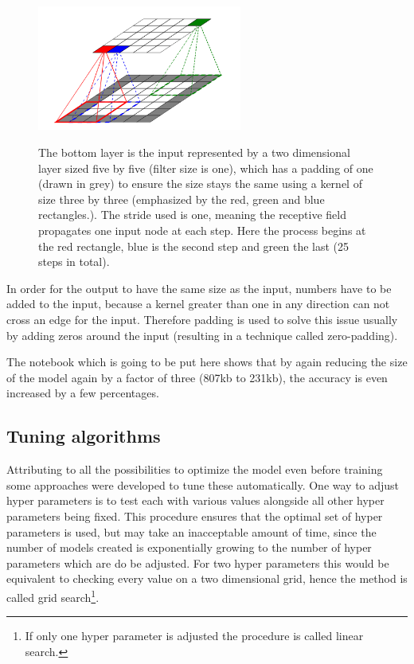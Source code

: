 \begin{figure}
    \centering
    \caption{ The bottom layer is the input represented by a two dimensional layer sized five by five (filter size is one), which has a padding of one (drawn in grey) to ensure the size stays the same using a kernel of size three by three (emphasized by the red, green and blue rectangles.). The stride used is one, meaning the receptive field propagates one input node at each step. Here the process begins at the red rectangle, blue is the second step and green the last (25  steps in total). }
    \includegraphics[width=0.6\textwidth]{images/conv_layer.png}
    \label{fig:conv_layer}
\end{figure}

In order for the output to have the same size as the input, numbers have to be added to the input, because a kernel greater than one in any direction can not cross an edge for the input.
Therefore padding is used to solve this issue usually by adding zeros around the input (resulting in a technique called zero-padding).

The notebook which is going to be put here %
shows that by again reducing the size of the model again by a factor of three (807kb to 231kb), the accuracy is even increased by a few percentages.



\subsection{Tuning algorithms}

Attributing to all the possibilities to optimize the model even before training some approaches were developed to tune these automatically.
One way to adjust hyper parameters is to test each with various values alongside all other hyper parameters being fixed.
This procedure ensures that the optimal set of hyper parameters is used, but may take an inacceptable amount of time, since the number of models created is exponentially growing to the number of hyper parameters which are do be adjusted.
For two hyper parameters this would be equivalent to checking every value on a two dimensional grid, hence the method is called grid search\footnote{If only one hyper parameter is adjusted the procedure is called linear search.}.

